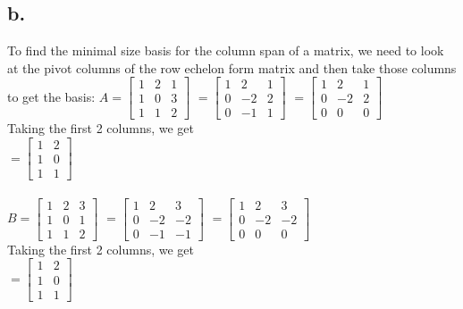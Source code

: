\documentclass{article}
\newcommand{\1}{\mathbf{1}}
\begin{document}
{\subsection*{b.}
To find the minimal size basis for the column span of a matrix, we need to look at the pivot columns of the row echelon form matrix and then take those columns to get the basis:
$A = \begin{bmatrix} 1 & 2 & 1 \\ 1 & 0 & 3 \\ 1 & 1 & 2 \end{bmatrix}$ 
$ = \begin{bmatrix} 1 & 2 & 1 \\ 0 & -2 & 2 \\ 0 & -1 & 1 \end{bmatrix}$
$ = \begin{bmatrix} 1 & 2 & 1 \\ 0 & -2 & 2 \\ 0 & 0 & 0 \end{bmatrix}$ \\
Taking the first 2 columns, we get \\
$ = \begin{bmatrix} 1 & 2 \\ 1 & 0 \\ 1 & 1 \end{bmatrix}$ \\ \\
$B = \begin{bmatrix} 1 & 2 & 3 \\ 1 & 0 & 1 \\ 1 & 1 & 2 \end{bmatrix}$ 
$ = \begin{bmatrix} 1 & 2 & 3 \\ 0 & -2 & -2 \\ 0 & -1 & -1 \end{bmatrix}$
$ = \begin{bmatrix} 1 & 2 & 3 \\ 0 & -2 & -2 \\ 0 & 0 & 0 \end{bmatrix}$ \\ 
Taking the first 2 columns, we get \\
$ = \begin{bmatrix} 1 & 2 \\ 1 & 0 \\ 1 & 1 \end{bmatrix}$

}
\end{document}
